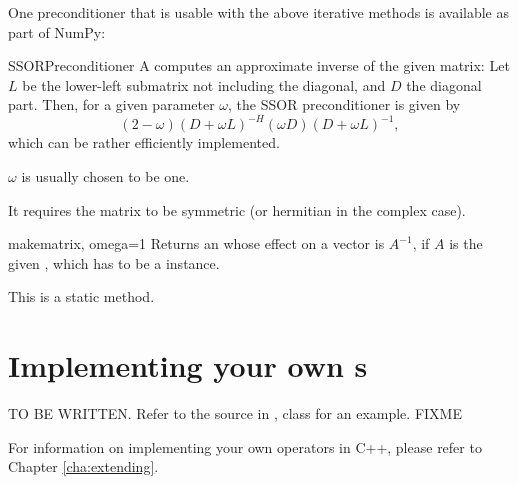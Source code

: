 One preconditioner that is usable with the above iterative methods is
available as part of NumPy:
\begin{classdesc*}{SSORPreconditioner}
  A  computes an approximate inverse of the
  given matrix: Let $L$ be the lower-left submatrix not including the
  diagonal, and $D$ the diagonal part. Then, for a given parameter
  $\omega$, the SSOR preconditioner is given by 
  \[
  (2-\omega)(D+\omega L)^{-H}(\omega D)(D+\omega L)^{-1},
  \]
  which can be rather efficiently implemented.

  $\omega$ is usually chosen to be one.

  It requires the matrix to be symmetric (or hermitian in the complex
  case).
\end{classdesc*}
\begin{methoddesc}{make}{matrix, omega=1}
  Returns an  whose effect on a vector is $A^{-1}$,
  if $A$ is the given , which has to be a 
   instance.

  This is a static method.
\end{methoddesc}

\section{Implementing your own s}

TO BE WRITTEN. Refer to the source in , 
class  for an example. FIXME

For information on implementing your own operators in C++, please
refer to Chapter \ref{cha:extending}.
